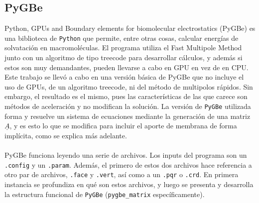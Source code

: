 \documentclass[12pt, oneside, numbers, spanish]{ezthesis}
\numberwithin{equation}{section}
\begin{document}
\subsection{PyGBe}\label{subsec:PyGBe}
Python, GPUs and Boundary elements for biomolecular electrostatics (PyGBe) es una biblioteca de \texttt{Python} que permite, entre otras cosas, calcular energías de solvatación en macromoléculas. El programa utiliza el Fast Multipole Method junto con un algoritmo de tipo treecode para desarrollar cálculos, y además si estos son muy demandantes, pueden llevarse a cabo en GPU en vez de en CPU. Este trabajo se llevó a cabo en una versión básica de PyGBe que no incluye el uso de GPUs, de un algoritmo treecode, ni del método de multipolos rápidos. Sin embargo, el resultado es el mismo, pues las características de las que carece son métodos de aceleración y no modifican la solución. La versión de \texttt{PyGBe} utilizada forma y resuelve un sistema de ecuaciones mediante la generación de una matriz $\underline{A}$, y es esto lo que se modifica para incluir el aporte de membrana de forma implícita, como se explica más adelante.\\\\
PyGBe funciona leyendo una serie de archivos. Los inputs del programa son un \texttt{.config} y un \texttt{.param}. Además, el primero de estos dos archivos hace referencia a otro par de archivos, \texttt{.face} y \texttt{.vert}, así como a un \texttt{.pqr} o \texttt{.crd}. En primera instancia se profundiza en qué son estos archivos, y luego se presenta y desarrolla la estructura funcional de \texttt{PyGBe} (\texttt{pygbe\_matrix} específicamente).\\\\
\end{document}
